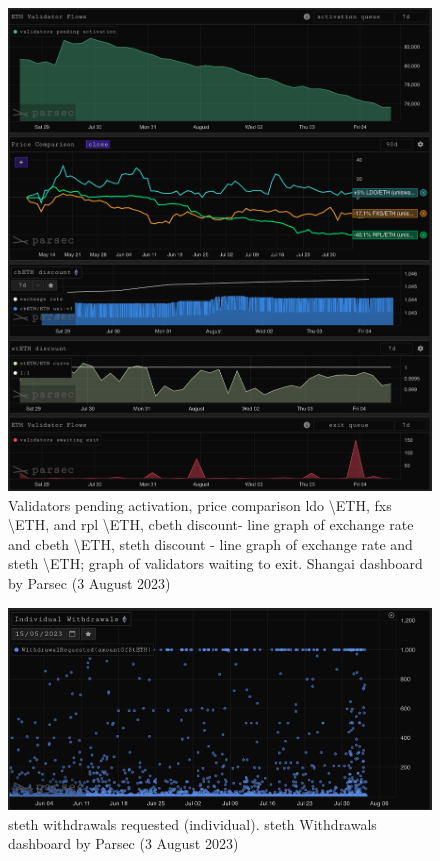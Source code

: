 \documentclass[UTF8]{article}
\begin{document}
{\begin{figure}[htbp]
\begin{center}
\includegraphics[width=\linewidth]{images/parsec2}
\caption{Validators pending activation, price comparison \gls{ldo} \textbackslash ETH, \gls{fxs} \textbackslash ETH, and \gls{rpl} \textbackslash ETH, \gls{cbeth} discount- line graph of exchange rate and \gls{cbeth} \textbackslash ETH, \gls{steth} discount - line graph of exchange rate and \gls{steth} \textbackslash ETH; graph of validators waiting to exit. Shangai dashboard by Parsec (3 August 2023)}
\label{fig:parsec2}
\end{center}
\end{figure}

\begin{figure}[htbp]
\begin{center}
\includegraphics[width=\linewidth]{images/parsec3}
\caption{\gls{steth} withdrawals requested (individual). \gls{steth} Withdrawals dashboard by Parsec (3 August 2023)}
\label{fig:parsec3}
\end{center}
\end{figure}

}
\end{document}
